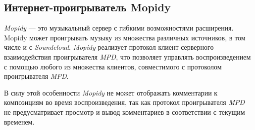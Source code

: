 \subsection{Интернет-проигрыватель Mopidy}


\textit{Mopidy}\cite{mopidy:main} --- это музыкальный сервер с гибкими
возможностями расширения. Mopidy может проигрывать музыку из множества
различных источников, в том числе и с \textit{Soundcloud}. \textit{Mopidy} реализует
протокол клиент-серверного взаимодействия проигрывателя \textit{MPD},
что позволяет управлять воспроизведением с помощью любого из
множества клиентов, совместимого с протоколом проигрывателя \textit{MPD}.


В силу этой особенности \textit{Mopidy} не может отображать комментарии
к композициям во время воспроизведения, так как  протокол
проигрывателя \textit{MPD} не предусматривает просмотр и вывод
комментариев в соответствии с текущим временем. 

